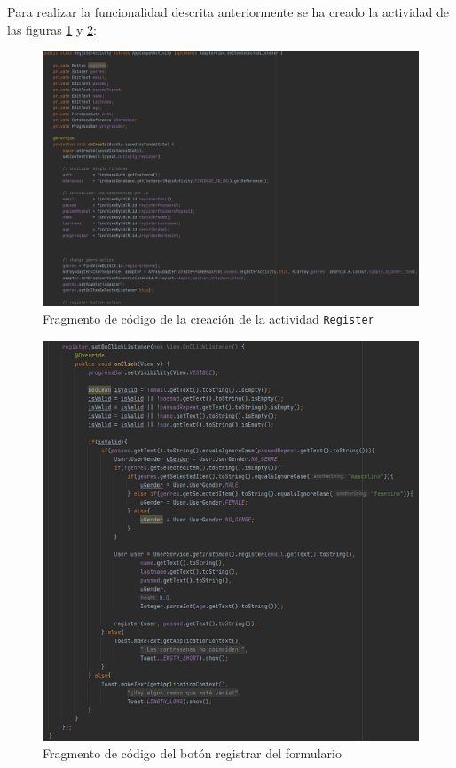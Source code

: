 Para realizar la funcionalidad descrita anteriormente se ha creado la actividad de las figuras \ref{fig:codereg1} y \ref{fig:codereg2}:
\begin{figure}[H]
    \centering
    \includegraphics[width=\textwidth]{Images/Capitulo7/codereg1.png}
        \caption{Fragmento de código de la creación de la actividad \texttt{Register}}
    \label{fig:codereg1}
\end{figure}
\begin{figure}[H]
    \centering
    \includegraphics[width=\textwidth]{Images/Capitulo7/codereg2.png}
        \caption{Fragmento de código del botón registrar del formulario}
    \label{fig:codereg2}
\end{figure}
